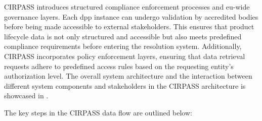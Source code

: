CIRPASS introduces structured compliance enforcement processes and \ac{eu}-wide governance layers. Each \ac{dpp} instance can undergo validation by accredited bodies before being made accessible to external stakeholders. This ensures that product lifecycle data is not only structured and accessible but also meets predefined compliance requirements before entering the resolution system. Additionally, CIRPASS incorporates policy enforcement layers, ensuring that data retrieval requests adhere to predefined access rules based on the requesting entity’s authorization level. The overall system architecture and the interaction between different system components and stakeholders in the CIRPASS architecture is showcased in . \autocite{Wenning.2024}

The key steps in the CIRPASS data flow are outlined below:

